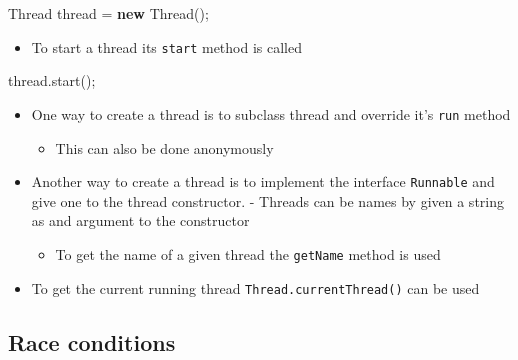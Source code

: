 \documentclass[11pt]{article}
\providecommand{\tightlist}{%
      \setlength{\itemsep}{0pt}\setlength{\parskip}{0pt}}
\newenvironment{Shaded}{}{}
\newcommand{\KeywordTok}[1]{\textcolor[rgb]{0.00,0.44,0.13}{\textbf{{#1}}}}
\newcommand{\FunctionTok}[1]{\textcolor[rgb]{0.02,0.16,0.49}{{#1}}}
\newcommand{\NormalTok}[1]{{#1}}
\newcommand{\BuiltInTok}[1]{{#1}}
\begin{document}
\begin{Shaded}
\begin{Highlighting}[]
\BuiltInTok{Thread}\NormalTok{ thread = }\KeywordTok{new} \BuiltInTok{Thread}\NormalTok{();}
\end{Highlighting}
\end{Shaded}

\begin{itemize}
\tightlist
\item
  To start a thread its \texttt{start} method is called
\end{itemize}

\begin{Shaded}
\begin{Highlighting}[]
\NormalTok{thread.}\FunctionTok{start}\NormalTok{();    }
\end{Highlighting}
\end{Shaded}

\begin{itemize}
\tightlist
\item
  One way to create a thread is to subclass thread and override it's
  \texttt{run} method

  \begin{itemize}
  \tightlist
  \item
    This can also be done anonymously
  \end{itemize}
\item
  Another way to create a thread is to implement the interface
  \texttt{Runnable} and give one to the thread constructor. - Threads
  can be names by given a string as and argument to the constructor

  \begin{itemize}
  \tightlist
  \item
    To get the name of a given thread the \texttt{getName} method is
    used
  \end{itemize}
\item
  To get the current running thread \texttt{Thread.currentThread()} can
  be used
\end{itemize}

    \hypertarget{race-conditions}{%
\subsection{Race conditions}\label{race-conditions}}
\end{document}
